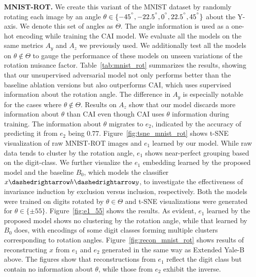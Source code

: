 
\textbf{MNIST-ROT.\quad} We create this variant of the MNIST dataset by randomly rotating each image by an angle $\theta \in \{-45^{\degree}, -22.5^{\degree}, 0^{\degree}, 22.5^{\degree}, 45^{\degree}\}$ about the Y-axis. We denote this set of angles as $\Theta$. The angle information is used as a one-hot encoding while training the CAI model. We evaluate all the models on the same metrics $A_y$ and $A_z$ we previously used. We additionally test all the models on $\theta \not \in \Theta$ to gauge the performance of these models on unseen variations of the rotation nuisance factor. Table~\ref{tab:mnist_rot} summarizes the results, showing that our unsupervised adversarial model not only performs better than the baseline ablation versions but also outperforms CAI, which uses supervised information about the rotation angle. The difference in $A_y$ is especially notable for the cases where $\theta \not \in \Theta$. Results on $A_z$ show that our model discards more information about $\theta$ than CAI even though CAI uses $\theta$ information during training. The information about $\theta$ migrates to $e_2$, indicated by the accuracy of predicting it from $e_2$ being $0.77$. Figure~\ref{fig:tsne_mnist_rot} shows t-SNE visualization of raw MNIST-ROT images and $e_1$ learned by our model. While raw data tends to cluster by the rotation angle, $e_1$ shows near-perfect grouping based on the digit-class. We further visualize the $e_1$ embedding learned by the proposed model and the baseline $B_0$, which models the classifier $x \dashedrightarrow h \dashedrightarrow y$, to investigate the effectiveness of invariance induction by exclusion versus inclusion, respectively. Both the models were trained on digits rotated by $\theta \in \Theta$ and  t-SNE visualizations were generated for $\theta \in \{\pm55\}$. Figure~\ref{fig:e1_55} shows the results. As evident, $e_1$ learned by the proposed model shows no clustering by the rotation angle, while that learned by $B_0$ does, with encodings of some digit classes forming multiple clusters corresponding to rotation angles. Figure~\ref{fig:recon_mnist_rot} shows results of reconstructing $x$ from $e_1$ and $e_2$ generated in the same way as Extended Yale-B above. The figures show that reconstructions from $e_1$ reflect the digit class but contain no information about $\theta$, while those from $e_2$ exhibit the inverse.

